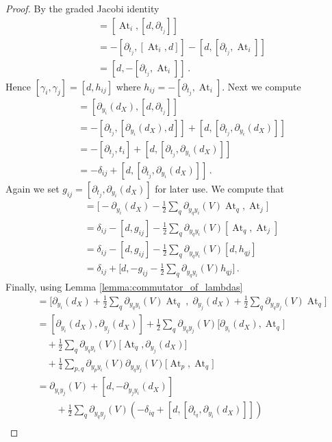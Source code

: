 \documentclass[english,letter paper,12pt,leqno]{article}
\theoremstyle{example}
\numberwithin{equation}{section}
\def\ferm{\gamma}
\def\fermc{\gamma^\dagger}
\DeclareMathOperator{\At}{At}
\begin{document}
\begin{proof}
By the graded Jacobi identity
\begin{align*}
[\At_i, \At_j] &= [\At_i, [d, \partial_{t_j}]]\\
&= - [\partial_{t_j}, [\At_i, d]] - [d, [\partial_{t_j}, \At_i]]\\
&= [d, -[\partial_{t_j}, \At_i]]\,.
\end{align*}
Hence $[\ferm_i, \ferm_j] = [d, h_{ij}]$ where $h_{ij} = - [ \partial_{t_j}, \At_i ]$. Next we compute
\begin{align*}
[\partial_{y_i}(d_X), \At_j] &= [\partial_{y_i}(d_X), [d, \partial_{t_j}]]\\
&= -[\partial_{t_j}, [\partial_{y_i}(d_X), d]] + [d, [\partial_{t_j}, \partial_{y_i}(d_X)]]\\
&= -[\partial_{t_j}, t_i] + [d, [\partial_{t_j}, \partial_{y_i}(d_X)]]\\
&= -\delta_{ij} + [d, [\partial_{t_j}, \partial_{y_i}(d_X)]]\,.
\end{align*}
Again we set $g_{ij} = [\partial_{t_j}, \partial_{y_i}(d_X)]$ for later use. We compute that
\begin{align*}
[ \fermc_i, \ferm_j] &= \big[- \partial_{y_i}(d_X) - \frac{1}{2} \sum_q \partial_{y_q y_i}(V) \At_{q}, \At_j \big]\\
&= \delta_{ij} - [d, g_{ij}] - \frac{1}{2} \sum_q \partial_{y_qy_i}(V) [ \At_q, \At_j]\\
&= \delta_{ij} - [d, g_{ij}] - \frac{1}{2} \sum_q \partial_{y_qy_i}(V) [d, h_{qj}]\\
&= \delta_{ij} + \big[d, -g_{ij} - \frac{1}{2} \sum_q \partial_{y_qy_i}(V) h_{qj}\big]\,.
\end{align*}
Finally, using Lemma \ref{lemma:commutator_of_lambdas}
\begin{align*}
[ \fermc_i, \fermc_j ] &= \Big[ \partial_{y_i}(d_X) + \frac{1}{2} \sum_q \partial_{y_q y_i}(V) \At_{q}\; , \; \partial_{y_j}(d_X) + \frac{1}{2} \sum_q \partial_{y_q y_j}(V) \At_{q} \Big]\\
&= [ \partial_{y_i}(d_X), \partial_{y_j}(d_X) ] + \frac{1}{2}\sum_q \partial_{y_qy_j}(V) \big[ \partial_{y_i}(d_X), \At_q \big]\\
&\quad + \frac{1}{2}\sum_q \partial_{y_q y_i}(V) \big[ \At_q, \partial_{y_j}(d_X) \big]\\
&\quad + \frac{1}{4}\sum_{p,q} \partial_{y_py_i}(V) \partial_{y_qy_j}(V) \big[ \At_p, \At_q \big]\\
&= \partial_{y_iy_j}(V) + [d, - \partial_{y_jy_i}(d_X)]\\
&\qquad + \frac{1}{2}\sum_q \partial_{y_qy_j}(V) \left( -\delta_{iq} + [d, [ \partial_{t_q}, \partial_{y_i}(d_X)]] \right)\\

\end{align*}
\end{proof}
\end{document}
